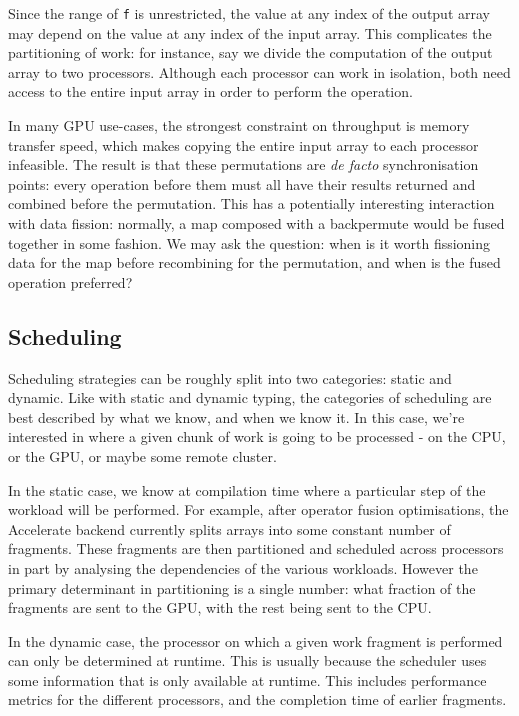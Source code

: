 \documentclass[a4paper,12pt]{article}
\newcommand{\icf}[1]{\mbox{\texttt{#1}}} %
\begin{document}
Since the range of \icf{f} is unrestricted, the value at any index of the output array may depend on the value at any index of the input array.
This complicates the partitioning of work: for instance, say we divide the computation of the output array to two processors.
Although each processor can work in isolation, both need access to the entire input array in order to perform the operation.

In many GPU use-cases, the strongest constraint on throughput is memory transfer speed, which makes copying the entire input array to each processor infeasible.
The result is that these permutations are \textit{de facto} synchronisation points: every operation before them must all have their results returned and combined before the permutation.
This has a potentially interesting interaction with data fission: normally, a map composed with a backpermute would be fused together in some fashion.
We may ask the question: when is it worth fissioning data for the map before recombining for the permutation, and when is the fused operation preferred?

\subsection{Scheduling}
Scheduling strategies can be roughly split into two categories: static and dynamic. \citep{jones_practical_2014}
Like with static and dynamic typing, the categories of scheduling are best described by what we know, and when we know it.
In this case, we're interested in where a given chunk of work is going to be processed - on the CPU, or the GPU, or maybe some remote cluster.

In the static case, we know at compilation time where a particular step of the workload will be performed.
For example, after operator fusion optimisations, the Accelerate backend currently splits arrays into some constant number of fragments.
These fragments are then partitioned and scheduled across processors in part by analysing the dependencies of the various workloads.
However the primary determinant in partitioning is a single number: what fraction of the fragments are sent to the GPU, with the rest being sent to the CPU.

In the dynamic case, the processor on which a given work fragment is performed can only be determined at runtime.
This is usually because the scheduler uses some information that is only available at runtime.
This includes performance metrics for the different processors, and the completion time of earlier fragments.
\end{document}
